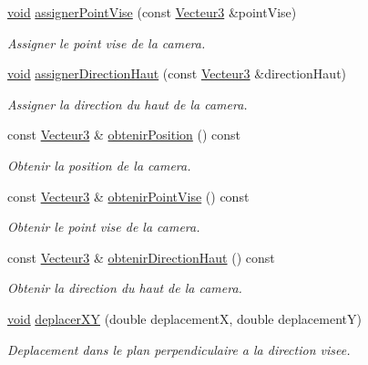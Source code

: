 \begin{DoxyCompactItemize}
\hyperlink{wglew_8h_aeea6e3dfae3acf232096f57d2d57f084}{void} \hyperlink{classvue_1_1_camera_a69846a87e30c5d8edb7929452836769b}{assigner\-Point\-Vise} (const \hyperlink{group__utilitaire_ga541aa4837ad9250d3a248dc82ee9ad4d}{Vecteur3} \&point\-Vise)
\begin{DoxyCompactList}\small\item\em Assigner le point vise de la camera. \end{DoxyCompactList}\item 
\hyperlink{wglew_8h_aeea6e3dfae3acf232096f57d2d57f084}{void} \hyperlink{classvue_1_1_camera_a3b184e5951bb0a4acab80af4e2c50039}{assigner\-Direction\-Haut} (const \hyperlink{group__utilitaire_ga541aa4837ad9250d3a248dc82ee9ad4d}{Vecteur3} \&direction\-Haut)
\begin{DoxyCompactList}\small\item\em Assigner la direction du haut de la camera. \end{DoxyCompactList}\item 
const \hyperlink{group__utilitaire_ga541aa4837ad9250d3a248dc82ee9ad4d}{Vecteur3} \& \hyperlink{classvue_1_1_camera_a9e5aa2c77549dd8db47c2f249983d0ad}{obtenir\-Position} () const 
\begin{DoxyCompactList}\small\item\em Obtenir la position de la camera. \end{DoxyCompactList}\item 
const \hyperlink{group__utilitaire_ga541aa4837ad9250d3a248dc82ee9ad4d}{Vecteur3} \& \hyperlink{classvue_1_1_camera_a4c2e0079ea5ab132e2cca625a7854a09}{obtenir\-Point\-Vise} () const 
\begin{DoxyCompactList}\small\item\em Obtenir le point vise de la camera. \end{DoxyCompactList}\item 
const \hyperlink{group__utilitaire_ga541aa4837ad9250d3a248dc82ee9ad4d}{Vecteur3} \& \hyperlink{classvue_1_1_camera_adecce98a16454753431306e7b6ca4c75}{obtenir\-Direction\-Haut} () const 
\begin{DoxyCompactList}\small\item\em Obtenir la direction du haut de la camera. \end{DoxyCompactList}\item 
\hyperlink{wglew_8h_aeea6e3dfae3acf232096f57d2d57f084}{void} \hyperlink{classvue_1_1_camera_aa08801e436ddf90400e632e402183618}{deplacer\-X\-Y} (double deplacement\-X, double deplacement\-Y)
\begin{DoxyCompactList}\small\item\em Deplacement dans le plan perpendiculaire a la direction visee. \end{DoxyCompactList}\item 

\end{DoxyCompactItemize}
